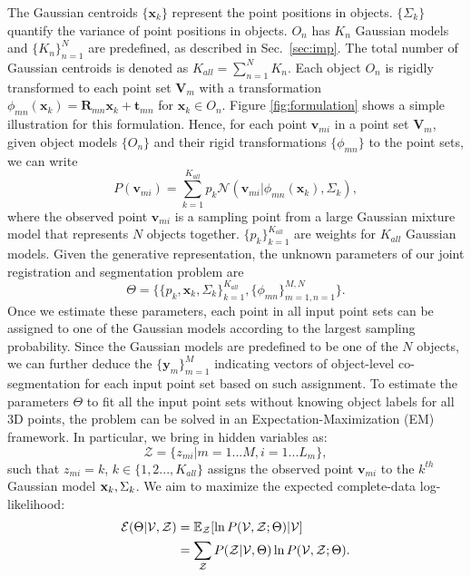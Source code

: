 The Gaussian centroids $\{\mathbf{x}_{k}\}$ represent the point positions in objects. $\{\Sigma_{k}\}$ quantify the variance of point positions in objects. $O_n$ has $K_n$ Gaussian models and $\{K_n\}_{n=1}^N$ are predefined, as described in Sec.~\ref{sec:imp}.
The total number of Gaussian centroids is denoted as $K_{all} = \sum_{n=1}^{N}K_n$.  
%
Each object $O_{n}$ is rigidly transformed to each point set $\mathbf{V}_m$ with a transformation $\phi_{mn}(\mathbf{x}_{k})=\mathbf{R}_{mn}\mathbf{x}_{k}+\mathbf{t}_{mn}$ for $\mathbf{x}_{k} \in O_n$.
%
Figure \ref{fig:formulation} shows a simple illustration for this formulation.
Hence, for each point $\mathbf{v}_{mi}$ in a point set $\mathbf{V}_m$, given object models $\{O_{n}\}$ and their rigid transformations $\{\phi_{mn}\}$ to the point sets, we can write
%
\begin{equation}
\label{equ:model}
P(\mathbf{v}_{mi})=\sum^{K_{all}}_{k=1}p_k\mathcal{N}(\mathbf{v}_{mi}|\phi_{mn}(\mathbf{x}_k),\Sigma_k),
\end{equation}
%
where the observed point $\mathbf{v}_{mi}$ is a sampling point from a large Gaussian mixture model that represents $N$ objects together.
$\{p_k\}_{k=1}^{K_{all}} $ are weights for $K_{all}$ Gaussian models. 
Given the generative representation, the unknown parameters of our joint registration and segmentation problem are
%
\begin{equation}
\varTheta=\big \{\{p_k,\mathbf{x}_{k},\Sigma_k\}_{k=1}^{K_{all}},\{\phi_{mn}\}_{m=1,n=1}^{M,N}\big\}.
\end{equation}
%
Once we estimate these parameters, each point in all input point sets can be assigned to one of the Gaussian models according to the largest sampling probability.
%
Since the Gaussian models are predefined to be one of the $N$ objects, we can further deduce the $\{\mathbf{y}_m\}_{m=1}^M$ indicating vectors of object-level co-segmentation for each input point set based on such assignment.
%
To estimate the parameters $\Theta$ to fit all the input point sets without knowing object labels for all 3D points, the problem can be solved in an Expectation-Maximization (EM) framework. 
%
In particular, we bring in hidden variables as: 
\begin{equation}
\mathcal{Z}=\{z_{mi}|m=1...M,i=1...L_m\},
\end{equation}
%
such that $z_{mi}=k$, $k \in \{1,2...,K_{all}\}$ assigns the observed point $\mathbf{v}_{mi}$ to the $k^{th}$ Gaussian model $\mathbf{x}_k, \Sigma_k$. 
%
We aim to maximize the expected complete-data log-likelihood:
\begin{equation}
\centering
\label{equ:obj0}
\begin{aligned}
\mathcal{E}(\Theta|\mathcal{V},\mathcal{Z})&=\mathbb{E}_{\mathcal{Z}}[\ln P(\mathcal{V},\mathcal{Z};\Theta)|\defV]\\&={\sum_{\mathcal{Z}}P(\defZ|\defV,\Theta)\ln{P(\mathcal{V},\mathcal{Z};\Theta)}}.
\end{aligned}
\end{equation}


